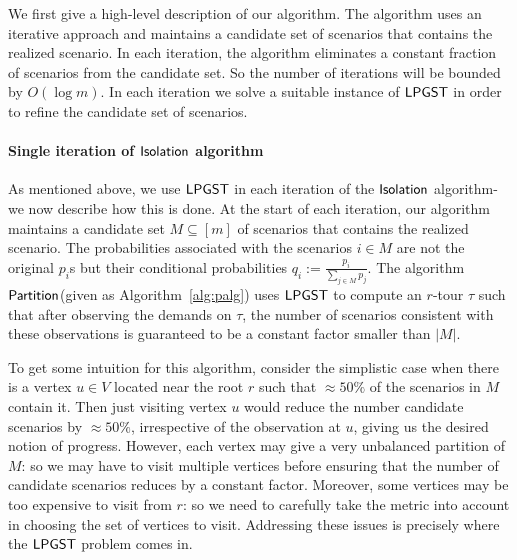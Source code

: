 \documentclass[11pt]{article}
\def\sse{\subseteq}
\def\palg{\ensuremath{{\sf Partition}}\xspace}
\def\isoprob{\ensuremath{{\sf Isolation}}\xspace}
\def\lpgst{\ensuremath{{\sf LPGST}}\xspace}
\begin{document}
We first give a high-level description of our algorithm. The algorithm uses an iterative 
approach and maintains a
candidate set of scenarios that contains the realized scenario. In each iteration, the algorithm eliminates a constant fraction of scenarios from the candidate set. So the number of iterations will be bounded by $O(\log m)$. In each iteration we solve a suitable instance of \lpgst in order to refine the candidate set of scenarios. 


\paragraph{Single iteration of \isoprob algorithm} As mentioned above, we use \lpgst in each iteration of 
the \isoprob algorithm- we now describe how this is done.
 At the start of each iteration, our algorithm maintains a candidate set $M\sse [m]$ of scenarios that contains the realized scenario.
The probabilities associated with the scenarios $i\in M$ are not the original $p_i$s but their conditional probabilities $q_i:=\frac{p_i}{\sum_{j\in M} p_j}$. The algorithm \palg (given as Algorithm~\ref{alg:palg}) uses \lpgst to compute an $r$-tour $\tau$ such that after
observing the demands on $\tau$, the number of scenarios consistent with these observations is guaranteed to be  a constant factor smaller than $|M|$. 


To get some intuition for this algorithm, consider the simplistic case when there is a vertex $u\in V$ located near the root $r$ such that $\approx 50\%$ of the scenarios in $M$ contain it. Then just 
visiting vertex $u$ would reduce the number candidate scenarios by $\approx 50\%$, irrespective of the observation at $u$,
giving us the desired notion of progress. However, each vertex may give a very unbalanced partition of $M$: so we may have to visit multiple vertices before ensuring that the number of candidate scenarios reduces by a constant factor. Moreover, some vertices may
be  too expensive to visit from $r$: so we need to carefully take the metric into account in choosing the set of vertices to visit. Addressing these issues is precisely where the \lpgst problem comes in.
\end{document}
